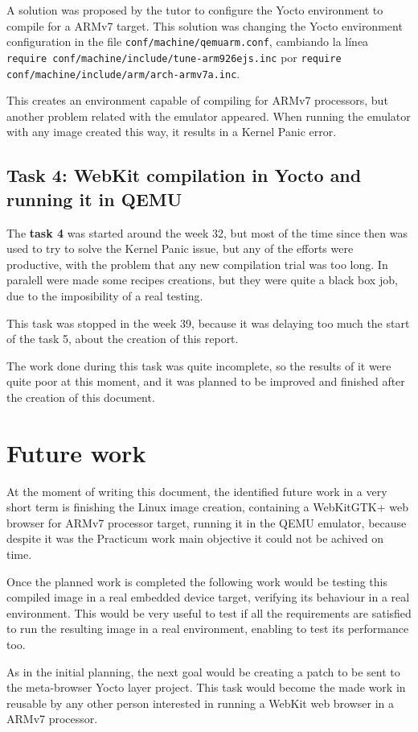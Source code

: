 \documentclass[a4paper,11pt,openany]{report}
\begin{document}
A solution was proposed by the tutor to configure the Yocto environment to compile for a ARMv7 target. This solution was changing the Yocto environment configuration in the file \verb#conf/machine/qemuarm.conf#, cambiando la línea \verb#require conf/machine/include/tune-arm926ejs.inc# por \verb#require conf/machine/include/arm/arch-armv7a.inc#.

This creates an environment capable of compiling for ARMv7 processors, but another problem related with the emulator appeared. When running the emulator with any image created this way, it results in a Kernel Panic error.

\section{Task 4: WebKit compilation in Yocto and running it in QEMU}
The \textbf{task 4} was started around the week 32, but most of the time since then was used to try to solve the Kernel Panic issue, but any of the efforts were productive, with the problem that any new compilation trial was too long. In paralell were made some recipes creations, but they were quite a black box job, due to the imposibility of a real testing.

This task was stopped in the week 39, because it was delaying too much the start of the task 5, about the creation of this report.

The work done during this task was quite incomplete, so the results of it were quite poor at this moment, and it was planned to be improved and finished after the creation of this document.

\chapter{Future work}
At the moment of writing this document, the identified future work in a very short term is finishing the Linux image creation, containing a WebKitGTK+ web browser for ARMv7 processor target, running it in the QEMU emulator, because despite it was the Practicum work main objective it could not be achived on time.

Once the planned work is completed the following work would be testing this compiled image in a real embedded device target, verifying its behaviour in a real environment. This would be very useful to test if all the requirements are satisfied to run the resulting image in a real environment, enabling to test its performance too.

As in the initial planning, the next goal would be creating a patch to be sent to the meta-browser Yocto layer project. This task would become the made work in reusable by any other person interested in running a WebKit web browser in a ARMv7 processor.
\end{document}
